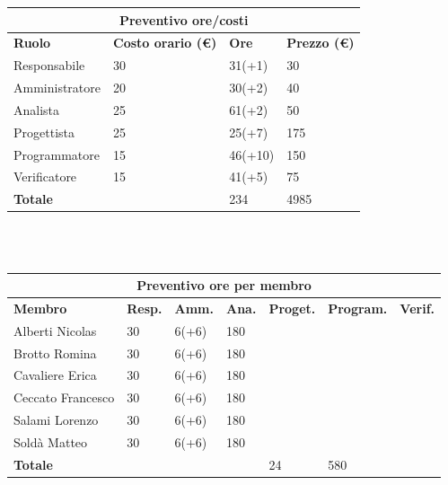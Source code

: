 \documentclass[a4paper, 12pt]{article}
\begin{document}
\begin{center}
	\begin{tabularx}{\textwidth}{|X|X|X|X|}
		\hline
		\multicolumn{4}{|c|}{\textbf{Preventivo ore/costi}}                                      \\
		\hline
		\hline
		\textbf{Ruolo}  & \textbf{Costo orario (\euro)} & \textbf{Ore} & \textbf{Prezzo (\euro)} \\
		\hline
		Responsabile    & 30                            & 31(+1)       & 30                      \\
		\hline
		Amministratore  & 20                            & 30(+2)       & 40                      \\
		\hline
		Analista        & 25                            & 61(+2)       & 50                       \\
		\hline
		Progettista     & 25                            & 25(+7)       & 175                      \\
		\hline
		Programmatore   & 15                            & 46(+10)       & 150                      \\
		\hline
		Verificatore    & 15                            & 41(+5)       & 75                      \\
		\hline
		\hline
		\textbf{Totale} &                               & 234          & 4985                    \\
		\hline
	\end{tabularx}\\[8pt]
	\mbox{}\\
\end{center}

\begin{center}
	\begin{tabularx}{\textwidth}{|X|X|X|X|X|X|X|}
		\hline
		\multicolumn{7}{|c|}{\textbf{Preventivo ore per membro}}                                      \\
		\hline
		\hline
		\textbf{Membro}  & \textbf{Resp.} & \textbf{Amm.} & \textbf{Ana.} &
		\textbf{Proget.} & \textbf{Program.} & \textbf{Verif.} \\
		\hline
		Alberti Nicolas    	& 30 	& 6(+6)       & 180  & &  &                 \\
		\hline
		Brotto Romina    	& 30 	& 6(+6)       & 180  & &  &                 \\
		\hline
		Cavaliere Erica    	& 30 	& 6(+6)       & 180  & &  &                 \\
		\hline
		Ceccato Francesco    	& 30 	& 6(+6)       & 180  & &   &                \\
		\hline
		Salami Lorenzo    	& 30 	& 6(+6)       & 180  & &     &               \\
		\hline
		Soldà Matteo    	& 30 	& 6(+6)       & 180  & &   &                 \\
		\hline
		\hline
		\textbf{Totale} &    & & & 24           & 580      &               \\
		\hline
	\end{tabularx}\\[8pt]
	\mbox{}\\
\end{center}
\end{document}
